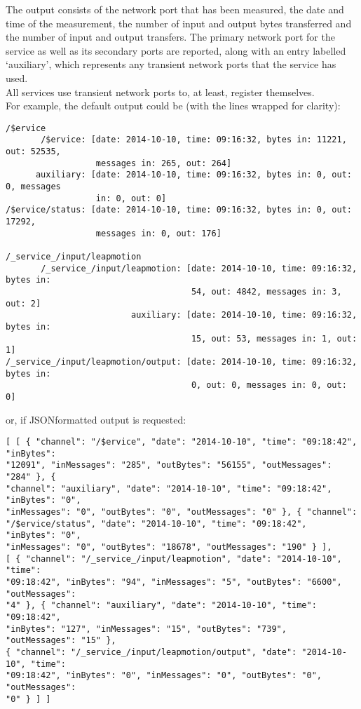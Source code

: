 The output consists of the \yarp{} network port that has been measured, the date and time
of the measurement, the number of input and output bytes transferred and the number of
input and output transfers.
The primary \yarp{} network port for the service as well as its secondary ports are
reported, along with an entry labelled `auxiliary', which represents any transient
\yarp{} network ports that the service has used.\\

All services use transient \yarp{} network ports to, at least, register themselves.\\

For example, the default output could be (with the lines wrapped for clarity):
\outputBegin
\begin{verbatim}
/$ervice
       /$ervice: [date: 2014-10-10, time: 09:16:32, bytes in: 11221, out: 52535,
                  messages in: 265, out: 264]
      auxiliary: [date: 2014-10-10, time: 09:16:32, bytes in: 0, out: 0, messages
                  in: 0, out: 0]
/$ervice/status: [date: 2014-10-10, time: 09:16:32, bytes in: 0, out: 17292,
                  messages in: 0, out: 176]

/_service_/input/leapmotion
       /_service_/input/leapmotion: [date: 2014-10-10, time: 09:16:32, bytes in:
                                     54, out: 4842, messages in: 3, out: 2]
                         auxiliary: [date: 2014-10-10, time: 09:16:32, bytes in:
                                     15, out: 53, messages in: 1, out: 1]
/_service_/input/leapmotion/output: [date: 2014-10-10, time: 09:16:32, bytes in:
                                     0, out: 0, messages in: 0, out: 0]
\end{verbatim}
\outputEnd
\condPage{}
or, if JSON\longDash{}formatted output is requested:
\outputBegin
\begin{verbatim}
[ [ { "channel": "/$ervice", "date": "2014-10-10", "time": "09:18:42", "inBytes":
"12091", "inMessages": "285", "outBytes": "56155", "outMessages": "284" }, {
"channel": "auxiliary", "date": "2014-10-10", "time": "09:18:42", "inBytes": "0",
"inMessages": "0", "outBytes": "0", "outMessages": "0" }, { "channel":
"/$ervice/status", "date": "2014-10-10", "time": "09:18:42", "inBytes": "0",
"inMessages": "0", "outBytes": "18678", "outMessages": "190" } ],
[ { "channel": "/_service_/input/leapmotion", "date": "2014-10-10", "time":
"09:18:42", "inBytes": "94", "inMessages": "5", "outBytes": "6600", "outMessages":
"4" }, { "channel": "auxiliary", "date": "2014-10-10", "time": "09:18:42",
"inBytes": "127", "inMessages": "15", "outBytes": "739", "outMessages": "15" },
{ "channel": "/_service_/input/leapmotion/output", "date": "2014-10-10", "time":
"09:18:42", "inBytes": "0", "inMessages": "0", "outBytes": "0", "outMessages":
"0" } ] ]
\end{verbatim}
